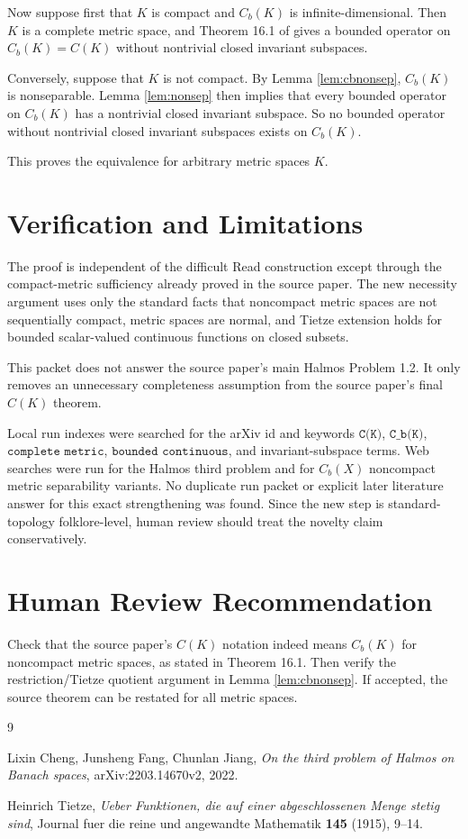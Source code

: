 \documentclass[11pt]{article}
\begin{document}
Now suppose first that \(K\) is compact and \(C_b(K)\) is infinite-dimensional.
Then \(K\) is a complete metric space, and Theorem 16.1 of \cite{CFJ} gives a
bounded operator on \(C_b(K)=C(K)\) without nontrivial closed invariant
subspaces.

Conversely, suppose that \(K\) is not compact.  By Lemma \ref{lem:cbnonsep},
\(C_b(K)\) is nonseparable.  Lemma \ref{lem:nonsep} then implies that every
bounded operator on \(C_b(K)\) has a nontrivial closed invariant subspace.  So
no bounded operator without nontrivial closed invariant subspaces exists on
\(C_b(K)\).

This proves the equivalence for arbitrary metric spaces \(K\).

\section*{Verification and Limitations}

The proof is independent of the difficult Read construction except through the
compact-metric sufficiency already proved in the source paper.  The new
necessity argument uses only the standard facts that noncompact metric spaces
are not sequentially compact, metric spaces are normal, and Tietze extension
holds for bounded scalar-valued continuous functions on closed subsets.

This packet does not answer the source paper's main Halmos Problem 1.2.  It
only removes an unnecessary completeness assumption from the source paper's
final \(C(K)\) theorem.

Local run indexes were searched for the arXiv id and keywords
\(\texttt{C(K)}\), \(\texttt{C\_b(K)}\), \(\texttt{complete metric}\),
\(\texttt{bounded continuous}\), and invariant-subspace terms.  Web searches
were run for the Halmos third problem and for \(C_b(X)\) noncompact metric
separability variants.  No duplicate run packet or explicit later literature
answer for this exact strengthening was found.  Since the new step is
standard-topology folklore-level, human review should treat the novelty claim
conservatively.

\section*{Human Review Recommendation}

Check that the source paper's \(C(K)\) notation indeed means \(C_b(K)\) for
noncompact metric spaces, as stated in Theorem 16.1.  Then verify the
restriction/Tietze quotient argument in Lemma \ref{lem:cbnonsep}.  If accepted,
the source theorem can be restated for all metric spaces.

\begin{thebibliography}{9}

Lixin Cheng, Junsheng Fang, Chunlan Jiang,
\emph{On the third problem of Halmos on Banach spaces},
arXiv:2203.14670v2, 2022.

Heinrich Tietze,
\emph{Ueber Funktionen, die auf einer abgeschlossenen Menge stetig sind},
Journal fuer die reine und angewandte Mathematik \textbf{145} (1915), 9--14.

\end{thebibliography}
\end{document}
